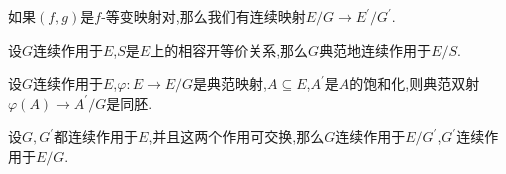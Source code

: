 \begin{remark}{}{}
	如果$\left(f,g\right)$是$f$-等变映射对,那么我们有连续映射$E/G\to E^{\prime}/G^{\prime}$.
\end{remark}

\begin{proposition}{}{}
	设$G$连续作用于$E$,$S$是$E$上的相容开等价关系,那么$G$典范地连续作用于$E/S$.
\end{proposition}

\begin{proposition}{}{}
	设$G$连续作用于$E$,$\varphi:E\to E/G$是典范映射,$A\subseteq E$,$A^{\prime}$是$A$的饱和化,则典范双射$\varphi\left(A\right)\to A^{\prime}/G$是同胚.
\end{proposition}

\begin{remark}{}{}
	设$G,G^{\prime}$都连续作用于$E$,并且这两个作用可交换,那么$G$连续作用于$E/G^{\prime}$,$G^{\prime}$连续作用于$E/G$.
\end{remark}

